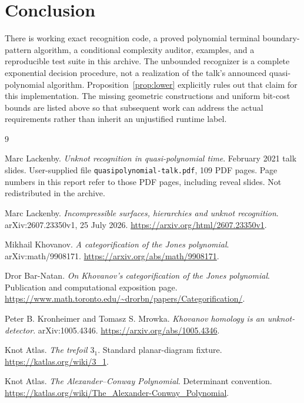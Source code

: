 \documentclass[11pt]{article}
\theoremstyle{remark}\newtheorem{remark}[theorem]{Remark}
\newcommand{\code}[1]{\texttt{#1}}
\begin{document}
\section{Conclusion}
\enlargethispage{2\baselineskip}

There is working exact recognition code, a proved polynomial terminal
boundary-pattern algorithm, a conditional complexity auditor, examples, and a
reproducible test suite in this archive. The unbounded recognizer is a complete
exponential decision procedure, not a realization of the talk's announced
quasi-polynomial algorithm. Proposition~\ref{prop:lower} explicitly rules out
that claim for this implementation. The missing geometric constructions and
uniform bit-cost bounds are listed above so that subsequent work can address
the actual requirements rather than inherit an unjustified runtime label.

\begin{thebibliography}{9}
\raggedright
{}
Marc Lackenby. \emph{Unknot recognition in quasi-polynomial time}.
February 2021 talk slides. User-supplied file
\code{quasipolynomial-talk.pdf}, 109 PDF pages. Page numbers in this report refer
to those PDF pages, including reveal slides. Not redistributed in the archive.

Marc Lackenby. \emph{Incompressible surfaces, hierarchies and unknot recognition}.
arXiv:2607.23350v1, 25 July 2026.
\url{https://arxiv.org/html/2607.23350v1}.

Mikhail Khovanov. \emph{A categorification of the Jones polynomial}.
arXiv:math/9908171.
\url{https://arxiv.org/abs/math/9908171}.

Dror Bar-Natan. \emph{On Khovanov's categorification of the Jones polynomial}.
Publication and computational exposition page.
\url{https://www.math.toronto.edu/~drorbn/papers/Categorification/}.

Peter B. Kronheimer and Tomasz S. Mrowka.
\emph{Khovanov homology is an unknot-detector}. arXiv:1005.4346.
\url{https://arxiv.org/abs/1005.4346}.

Knot Atlas. \emph{The trefoil $3_1$}. Standard planar-diagram fixture.
\url{https://katlas.org/wiki/3_1}.

Knot Atlas. \emph{The Alexander--Conway Polynomial}. Determinant convention.
\url{https://katlas.org/wiki/The_Alexander-Conway_Polynomial}.
\end{thebibliography}
\end{document}
